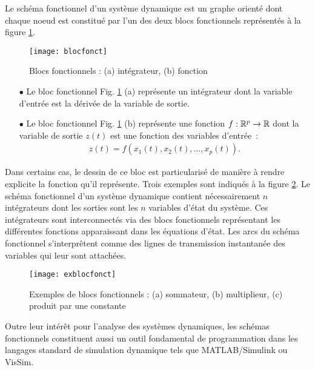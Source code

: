 Le schéma fonctionnel d'un système dynamique est un graphe orienté 
dont chaque noeud est constitué par l'un des deux blocs fonctionnels 
représentés à la figure \ref{Fig:blocfonct}.
\begin{figure}[htbp] 
   \centering
   \texttt{[image: blocfonct]} 
   \caption{Blocs fonctionnels : (a) intégrateur, (b) fonction}
   \label{Fig:blocfonct}
\end{figure}
\begin{itemize}
\item[$\bullet$] Le bloc fonctionnel Fig. \ref{Fig:blocfonct} 
(a) représente un intégrateur dont la variable d'entrée est 
la dérivée de la variable de sortie.
\item[$\bullet$] Le bloc fonctionnel Fig. \ref{Fig:blocfonct} 
(b) représente une fonction $f: \mathbb{R}^p \rightarrow \mathbb{R}$ dont la variable de 
sortie $z(t)$ est une fonction des variables d'entrée~:
\begin{equation*} \begin{split}
z(t) = f(x_1(t), x_2(t), \dots , x_p(t)).
\end{split} \end{equation*}
\end{itemize}
Dans certains cas, le dessin de ce bloc est particularisé de manière à rendre explicite la fonction qu'il représente. Trois exemples sont indiqués à la figure \ref{Fig:exblocfonct}.  Le schéma fonctionnel d'un système dynamique contient nécessairement $n$ intégrateurs dont les sorties sont les $n$ variables d'état du système. Ces intégrateurs sont interconnectés via des blocs fonctionnels représentant les différentes fonctions apparaissant dans les équations d'état. Les arcs du schéma fonctionnel s'interprêtent comme des lignes de transmission instantanée des variables qui leur sont attachées.
\begin{figure}[htbp] 
   \centering
   \texttt{[image: exblocfonct]} 
   \caption{Exemples de blocs fonctionnels : (a) sommateur, (b) multiplieur, (c) produit par une constante}
   \label{Fig:exblocfonct}
\end{figure}

Outre leur intérêt pour l'analyse des systèmes dynamiques, les 
schémas fonctionnels constituent aussi un outil fondamental de 
programmation dans les langages standard de simulation dynamique 
tels que MATLAB/Simulink ou VisSim.

